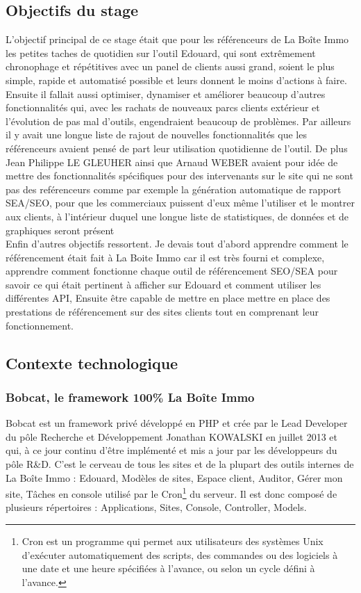\documentclass[12pt]{article}
\begin{document}
\newpage
\subsection{Objectifs du stage}

L'objectif principal de ce stage était que pour les référenceurs de La Boîte Immo  les petites taches de quotidien sur l'outil Edouard, qui sont extrêmement chronophage et répétitives avec un panel de clients aussi grand, soient le plus simple, rapide et automatisé possible et leurs donnent le moins d'actions à faire. Ensuite il fallait aussi optimiser, dynamiser et améliorer beaucoup d'autres fonctionnalités qui, avec les rachats de nouveaux parcs clients extérieur et l'évolution de pas mal d'outils, engendraient beaucoup de problèmes. Par ailleurs il y avait une longue liste de rajout de nouvelles fonctionnalités que les référenceurs avaient pensé de part leur utilisation quotidienne de l'outil. De plus Jean Philippe LE GLEUHER ainsi que Arnaud WEBER avaient pour idée de mettre des fonctionnalités spécifiques pour des intervenants sur le site qui ne sont pas des reférenceurs comme par exemple la génération automatique de rapport SEA/SEO, pour que les commerciaux puissent d'eux même l'utiliser et le montrer aux clients, à l'intérieur duquel une longue liste de statistiques, de données et de graphiques seront présent\\
Enfin d'autres objectifs ressortent. Je devais tout d'abord apprendre comment le référencement était fait à La Boite Immo car il est très fourni et complexe, apprendre comment fonctionne chaque outil de référencement SEO/SEA pour savoir ce qui était pertinent à afficher sur Edouard et comment utiliser les différentes API, Ensuite être capable de mettre en place mettre en place des prestations de référencement sur des sites clients tout en comprenant leur fonctionnement.

\newpage
\subsection{Contexte technologique}
\subsubsection{Bobcat, le framework 100\% La Boîte Immo}
Bobcat est un framework privé développé en PHP et crée par le Lead Developer du pôle Recherche et Développement Jonathan KOWALSKI en juillet 2013 et qui, à ce jour continu d'être implémenté et mis a jour par les développeurs du pôle R\&D. C'est le cerveau de tous les sites et de la plupart des outils internes de La Boîte Immo :
Edouard, Modèles de sites, Espace client, Auditor, Gérer mon site, Tâches en console utilisé par le Cron\footnote{Cron est un programme qui permet aux utilisateurs des systèmes Unix d’exécuter automatiquement des scripts, des commandes ou des logiciels à une date et une heure spécifiées à l’avance, ou selon un cycle défini à l’avance.} du serveur.
Il est donc composé de plusieurs répertoires : Applications, Sites, Console, Controller, Models.
\end{document}
